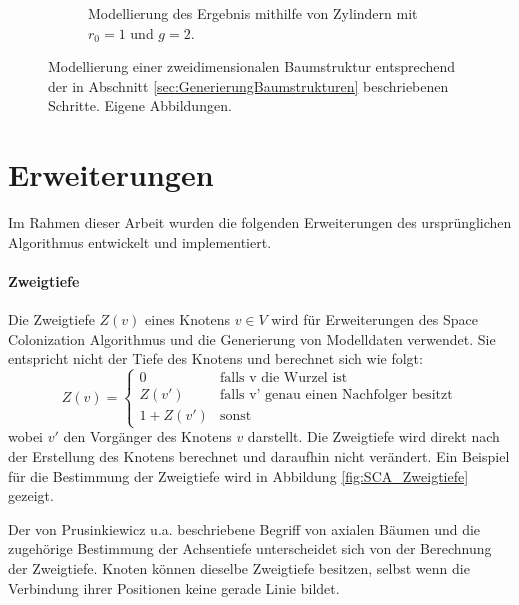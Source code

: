 \begin{figure} [htbp]
\begin{subfigure}[t]{.4\textwidth}
		\caption{Modellierung des Ergebnis mithilfe von Zylindern mit $r_0 = 1$ und $g=2$.}
		\label{subfig:SCA_Extended4}
	\end{subfigure}
	\caption{Modellierung einer zweidimensionalen Baumstruktur entsprechend der in Abschnitt \ref{sec:GenerierungBaumstrukturen} beschriebenen Schritte. Eigene Abbildungen.}
	\label{fig:SCA_Extended}
\end{figure}

\section{Erweiterungen} \label{sec:SCA_Erweiterungen}

Im Rahmen dieser Arbeit wurden die folgenden Erweiterungen des ursprünglichen Algorithmus entwickelt und implementiert.

\paragraph{Zweigtiefe}

Die Zweigtiefe $Z(v)$ eines Knotens $v \in V$ wird für Erweiterungen des Space Colonization Algorithmus und die Generierung von Modelldaten verwendet. Sie entspricht nicht der Tiefe des Knotens und berechnet sich wie folgt:
\begin{equation}
Z(v)= \begin{cases}
0 & \text{falls v die Wurzel ist} \\
Z(v') & \text{falls v' genau einen Nachfolger besitzt}\\
1 + Z(v') & \text{sonst}
\end{cases} 
\end{equation}
wobei $v'$ den Vorgänger des Knotens $v$ darstellt. Die Zweigtiefe wird direkt nach der Erstellung des Knotens berechnet und daraufhin nicht verändert. Ein Beispiel für die Bestimmung der Zweigtiefe wird in Abbildung \ref{fig:SCA_Zweigtiefe} gezeigt.

Der von Prusinkiewicz u.a. \cite{ABOP:04} beschriebene Begriff von axialen Bäumen \cite[S.21]{ABOP:04} und die zugehörige Bestimmung der Achsentiefe unterscheidet sich von der Berechnung der Zweigtiefe. Knoten können dieselbe Zweigtiefe besitzen, selbst wenn die Verbindung ihrer Positionen keine gerade Linie bildet.

